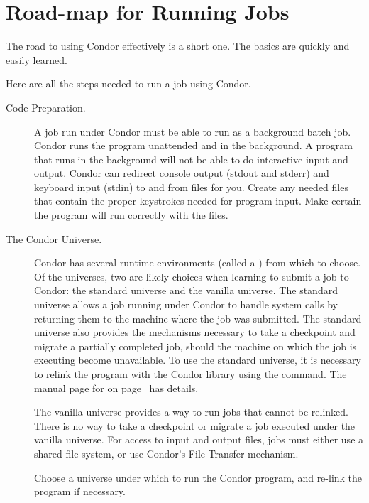 \section{Road-map for Running Jobs}

The road to using Condor effectively is a short one.  The basics
are quickly and easily learned.

Here are all the steps needed to run a job using Condor.
\begin{description}

\item[Code Preparation.]
A job run under Condor must be able to 
run as a background batch job.
Condor runs the program unattended and in the background. 
A program that runs in the background will not be able
to do interactive input and output.
Condor can redirect console output (stdout and stderr)
and keyboard input (stdin)
to and from files for you.
Create any needed files that contain
the proper keystrokes needed for program input.
Make certain the program will run correctly with the files.

\item[The Condor Universe.]
Condor has several 
runtime environments (called a ) from which to choose.
Of the universes, two are likely choices when learning
to submit a job to Condor: the standard universe and the vanilla universe.
The standard universe allows a job running under Condor to
handle system calls by returning them to the machine where the
job was submitted.
The standard universe also provides the mechanisms necessary
to take a checkpoint and migrate a partially completed job,
should the machine on which the job is executing become
unavailable.
To use the standard universe, it is necessary to
relink the program with the Condor library using the
 command.
The manual page for  on page~\pageref{man-condor-compile} has details.

The vanilla universe provides a way to run jobs that cannot be
relinked.
There is no way to take a checkpoint or migrate a job executed
under the vanilla universe.
For access to input and output files, jobs must either use a shared
file system, or use Condor's File Transfer mechanism.

Choose a universe under which to run the Condor program,
and re-link the program if necessary.


\end{description}
